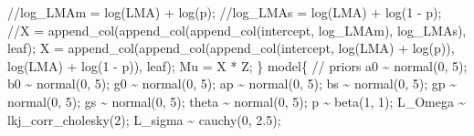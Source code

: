 \documentclass[
  12pt,
  letterpaper,
  DIV=11,
  numbers=noendperiod]{scrartcl}
\newenvironment{Shaded}{\begin{snugshade}}{\end{snugshade}}
\newcommand{\CommentTok}[1]{\textcolor[rgb]{0.37,0.37,0.37}{#1}}
\newcommand{\DecValTok}[1]{\textcolor[rgb]{0.68,0.00,0.00}{#1}}
\newcommand{\FloatTok}[1]{\textcolor[rgb]{0.68,0.00,0.00}{#1}}
\newcommand{\KeywordTok}[1]{\textcolor[rgb]{0.00,0.23,0.31}{#1}}
\newcommand{\NormalTok}[1]{\textcolor[rgb]{0.00,0.23,0.31}{#1}}
\begin{document}
\begin{Shaded}
\begin{Highlighting}[]
  \CommentTok{//log\_LMAm = log(LMA) + log(p);}
  \CommentTok{//log\_LMAs = log(LMA) + log(1 {-} p);}
  \CommentTok{//X = append\_col(append\_col(append\_col(intercept, log\_LMAm), log\_LMAs), leaf);}
\NormalTok{  X = append\_col(append\_col(append\_col(intercept,}
\NormalTok{    log(LMA) + log(p)),}
\NormalTok{    log(LMA) + log(}\DecValTok{1}\NormalTok{ {-} p)),}
\NormalTok{     leaf);}
\NormalTok{  Mu = X * Z;}
\NormalTok{\}}
\KeywordTok{model}\NormalTok{\{}
  \CommentTok{// priors}
\NormalTok{  a0 \textasciitilde{} normal(}\DecValTok{0}\NormalTok{, }\DecValTok{5}\NormalTok{);}
\NormalTok{  b0 \textasciitilde{} normal(}\DecValTok{0}\NormalTok{, }\DecValTok{5}\NormalTok{);}
\NormalTok{  g0 \textasciitilde{} normal(}\DecValTok{0}\NormalTok{, }\DecValTok{5}\NormalTok{);}
\NormalTok{  ap \textasciitilde{} normal(}\DecValTok{0}\NormalTok{, }\DecValTok{5}\NormalTok{);}
\NormalTok{  bs \textasciitilde{} normal(}\DecValTok{0}\NormalTok{, }\DecValTok{5}\NormalTok{);}
\NormalTok{  gp \textasciitilde{} normal(}\DecValTok{0}\NormalTok{, }\DecValTok{5}\NormalTok{);}
\NormalTok{  gs \textasciitilde{} normal(}\DecValTok{0}\NormalTok{, }\DecValTok{5}\NormalTok{);}
\NormalTok{  theta \textasciitilde{} normal(}\DecValTok{0}\NormalTok{, }\DecValTok{5}\NormalTok{);}
\NormalTok{  p \textasciitilde{} beta(}\DecValTok{1}\NormalTok{, }\DecValTok{1}\NormalTok{);}
\NormalTok{  L\_Omega \textasciitilde{} lkj\_corr\_cholesky(}\DecValTok{2}\NormalTok{);}
\NormalTok{  L\_sigma \textasciitilde{} cauchy(}\DecValTok{0}\NormalTok{, }\FloatTok{2.5}\NormalTok{);}


\end{Highlighting}
\end{Shaded}
\end{document}
